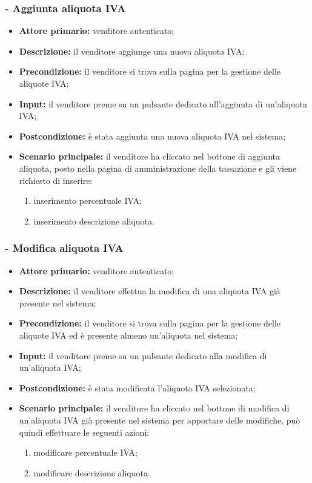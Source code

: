 \subsubsection{- Aggiunta aliquota IVA}
\begin{itemize}
    \item \textbf{Attore primario:} venditore autenticato;
    \item \textbf{Descrizione:} il venditore aggiunge una nuova aliquota IVA;
    \item \textbf{Precondizione:} il venditore si trova sulla pagina per la gestione delle aliquote IVA;
    \item \textbf{Input:} il venditore preme su un pulsante dedicato all'aggiunta di un'aliquota IVA;
    \item \textbf{Postcondizione:} è stata aggiunta una nuova aliquota IVA nel sistema;
    \item \textbf{Scenario principale:} il venditore ha cliccato nel bottone di aggiunta aliquota, posto nella pagina di amministrazione della tassazione e gli viene richiesto di inserire:
          \begin{enumerate}
              \item inserimento percentuale IVA;
              \item inserimento descrizione aliquota.
          \end{enumerate}
\end{itemize}

\stepsubUserCase
\subsubsection{- Modifica aliquota IVA}
\begin{itemize}
    \item \textbf{Attore primario:} venditore autenticato;
    \item \textbf{Descrizione:} il venditore effettua la modifica di una aliquota IVA già presente nel sistema;
    \item \textbf{Precondizione:} il venditore si trova sulla pagina per la gestione delle aliquote IVA ed è presente almeno un'aliquota nel sistema;
    \item \textbf{Input:} il venditore preme su un pulsante dedicato alla modifica di un'aliquota IVA;
    \item \textbf{Postcondizione:} è stata modificata l'aliquota IVA selezionata;
    \item \textbf{Scenario principale:} il venditore ha cliccato nel bottone di modifica di un’aliquota IVA già presente nel sistema per apportare delle modifiche, può quindi effettuare le seguenti azioni:
          \begin{enumerate}
              \item modificare percentuale IVA;
              \item modificare descrizione aliquota.
          \end{enumerate}
\end{itemize}


